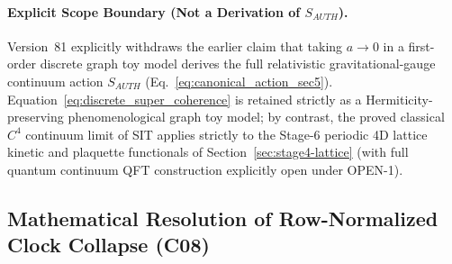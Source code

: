 \documentclass[american,11pt,letterpaper]{article}
\def\mathrm#1{#1}%
\def\texttt#1{#1}%
\begin{document}
\paragraph{Explicit Scope Boundary (Not a Derivation of $S_{\mathrm{AUTH}}$).}
Version~81 explicitly withdraws the earlier claim that taking $a \to 0$ in a first-order discrete graph toy model derives the full relativistic gravitational-gauge continuum action $S_{\mathrm{AUTH}}$ (Eq.~\eqref{eq:canonical_action_sec5}). Equation~\eqref{eq:discrete_super_coherence} is retained strictly as a Hermiticity-preserving phenomenological graph toy model; by contrast, the proved classical $C^4$ continuum limit of SIT applies strictly to the Stage-6 periodic 4D lattice kinetic and plaquette functionals of Section~\ref{sec:stage4-lattice} (with full quantum continuum QFT construction explicitly open under \texttt{OPEN-1}).

\subsection{Mathematical Resolution of Row-Normalized Clock Collapse (\texttt{C08})}
\label{sec:c08-network-resolution}
\end{document}
